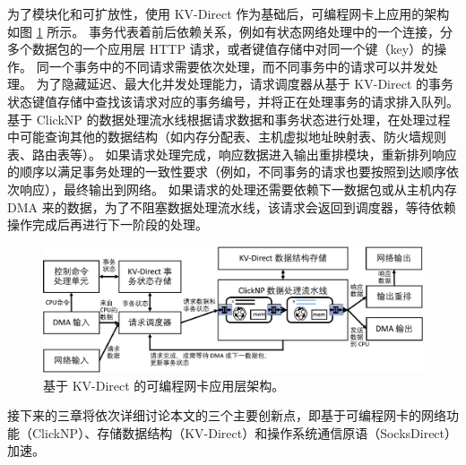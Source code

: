 为了模块化和可扩放性，使用 KV-Direct 作为基础后，可编程网卡上应用的架构如图 \ref{arch:fig:kvdirect_arch} 所示。
事务代表着前后依赖关系，例如有状态网络处理中的一个连接，分多个数据包的一个应用层 HTTP 请求，或者键值存储中对同一个键（key）的操作。
同一个事务中的不同请求需要依次处理，而不同事务中的请求可以并发处理。
为了隐藏延迟、最大化并发处理能力，请求调度器从基于 KV-Direct 的事务状态键值存储中查找该请求对应的事务编号，并将正在处理事务的请求排入队列。
基于 ClickNP 的数据处理流水线根据请求数据和事务状态进行处理，在处理过程中可能查询其他的数据结构（如内存分配表、主机虚拟地址映射表、防火墙规则表、路由表等）。
如果请求处理完成，响应数据进入输出重排模块，重新排列响应的顺序以满足事务处理的一致性要求（例如，不同事务的请求也要按照到达顺序依次响应），最终输出到网络。
如果请求的处理还需要依赖下一数据包或从主机内存 DMA 来的数据，为了不阻塞数据处理流水线，该请求会返回到调度器，等待依赖操作完成后再进行下一阶段的处理。


\begin{figure}[htbp]
	\centering
	\includegraphics[width=1.0\textwidth]{figures/kvdirect_arch.pdf}
	\caption{基于 KV-Direct 的可编程网卡应用层架构。}
	\label{arch:fig:kvdirect_arch}
\end{figure}
\fi

接下来的三章将依次详细讨论本文的三个主要创新点，即基于可编程网卡的网络功能（ClickNP）、存储数据结构（KV-Direct）和操作系统通信原语（SocksDirect）加速。
